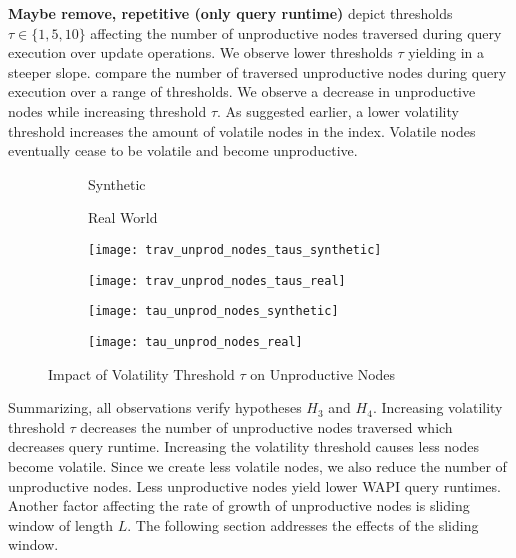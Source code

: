 \documentclass[abstracton,12pt]{scrartcl}
\theoremstyle{definition}
\begin{document}
\textbf{Maybe remove, repetitive (only query runtime)}
depict thresholds $\tau \in \{1,5,10\}$ affecting the number of unproductive
nodes traversed during query execution over update operations. We observe lower
thresholds $\tau$ yielding in a steeper slope.
 compare the
number of traversed unproductive nodes during query execution over a range of
thresholds. We observe a decrease in unproductive nodes while increasing
threshold $\tau$. As suggested earlier, a lower volatility threshold
increases the amount of volatile nodes in the index. Volatile nodes eventually
cease to be volatile and become unproductive.

\begin{figure}
  \centering
  \begin{subfigure}{0.49\linewidth}
    \centering
    Synthetic
  \end{subfigure}
  \begin{subfigure}{0.49\linewidth}
    \centering
    Real World
  \end{subfigure}
  \begin{subfigure}{0.49\linewidth}
    \centering
    \texttt{[image: trav\_unprod\_nodes\_taus\_synthetic]}
    \caption{}
    \label{fig:trav_unprod_nodes_taus_synthetic}
  \end{subfigure}
  \begin{subfigure}{0.49\linewidth}
    \centering
    \texttt{[image: trav\_unprod\_nodes\_taus\_real]}
    \caption{}
    \label{fig:trav_unprod_nodes_taus_real}
  \end{subfigure}
  \begin{subfigure}{0.49\linewidth}
    \centering
    \texttt{[image: tau\_unprod\_nodes\_synthetic]}
    \caption{}
    \label{fig:tau_trav_unprod_nodes_synthetic}
  \end{subfigure}
  \begin{subfigure}{0.49\linewidth}
    \centering
    \texttt{[image: tau\_unprod\_nodes\_real]}
    \caption{}
    \label{fig:tau_trav_unprod_nodes_real}
  \end{subfigure}
  \caption{Impact of Volatility Threshold $\tau$ on Unproductive Nodes}
\end{figure}

Summarizing, all observations verify hypotheses $H_3$ and $H_4$.
Increasing volatility threshold $\tau$ decreases the number of unproductive
nodes traversed which decreases query runtime. Increasing the volatility
threshold causes less nodes become volatile. Since we create less volatile
nodes, we also reduce the number of unproductive nodes. Less unproductive
nodes yield lower WAPI query runtimes. Another factor affecting the rate of
growth of unproductive nodes is sliding window of length $L$. The following
section addresses the effects of the sliding window.
\end{document}
